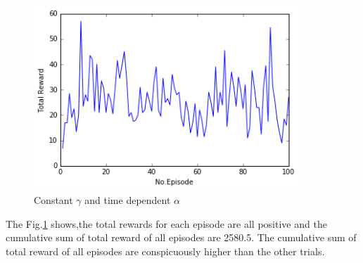 \documentclass[a4paper,11pt]{article}
\begin{document}
\begin{figure}[H]
\begin{center}
\includegraphics[width=100mm]{graph/gamma_con.jpg}
\end{center}
\caption{ Constant $\gamma$ and time dependent $\alpha$}
\label{fig:four}
\end{figure}

The Fig.\ref{fig:four} shows,the total rewards for each episode are all positive and the cumulative sum of total reward of all episodes are 2580.5.
The cumulative sum of total reward of all episodes are conspicuously higher than the other trials. 
\end{document}
